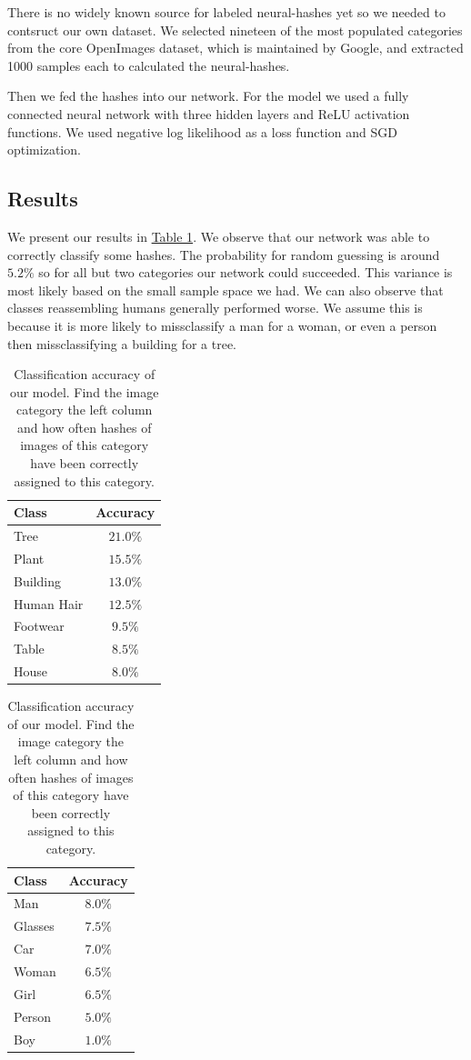 \documentclass[10pt,twocolumn,letterpaper]{article}
\begin{document}
There is no widely known source for labeled neural-hashes yet so we needed to contsruct our own dataset. We selected nineteen of the most populated categories from the core OpenImages dataset, which is maintained by Google, and extracted 1000 samples each to calculated the neural-hashes. 

Then we fed the hashes into our network. For the model we used a fully connected neural network with three hidden layers and ReLU activation functions. We used negative log likelihood as a loss function and SGD optimization. 

\subsection{Results}

We present our results in \hyperref[tab:one]{Table 1}. We observe that our network was able to correctly classify some hashes. The probability for random guessing is around $5.2\%$ so for all but two categories our network could succeeded. This variance is most likely based on the small sample space we had.  We can also observe that classes reassembling humans generally performed worse. We assume this is because it is more likely to missclassify a man for a woman, or even a person then missclassifying a building for a tree. 

\begin{table}
  \centering
  \begin{tabular}{@{}lc@{}}
    \toprule
    \textbf{Class} & \textbf{Accuracy} \\
    \midrule
    Tree & $21.0\%$ \\
    Plant & $15.5\%$ \\
    Building & $13.0\%$ \\
    Human Hair & $12.5\%$ \\
    Footwear & $9.5\%$ \\
    Table & $8.5\%$ \\
    House & $8.0\%$ \\
    \bottomrule
  \end{tabular}
  \hspace{10px}
  \begin{tabular}{@{}lc@{}}
    \toprule
    \textbf{Class} & \textbf{Accuracy} \\
    \midrule
    Man & $8.0\%$ \\
    Glasses & $7.5\%$ \\
    Car & $7.0\%$ \\
    Woman & $6.5\%$ \\
    Girl & $6.5\%$ \\
    Person & $5.0\%$ \\
    Boy & $1.0\%$ \\
    \bottomrule
  \end{tabular}
  \caption{Classification accuracy of our model. Find the image category the left column and how often hashes of images of this category have been correctly assigned to this category.}
  \label{tab:one}
\end{table}
\end{document}
